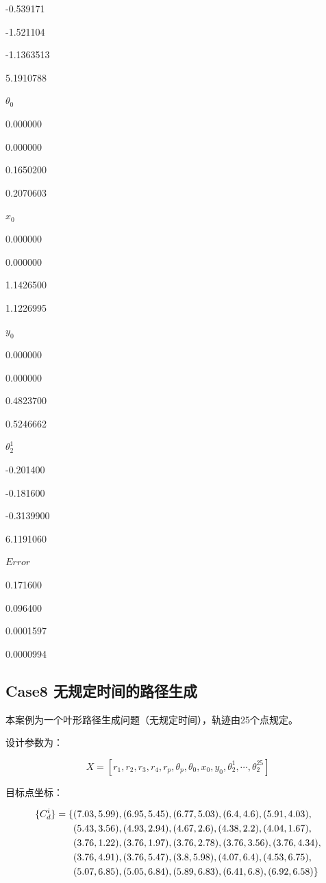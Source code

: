 \documentclass[]{ctexbook}
\theoremstyle{definition}
\theoremstyle{definition}
\theoremstyle{definition}
\theoremstyle{remark}
\begin{document}
-0.539171

-1.521104

-1.1363513

5.1910788

\(θ_0\)

0.000000

0.000000

0.1650200

0.2070603

\(x_0\)

0.000000

0.000000

1.1426500

1.1226995

\(y_0\)

0.000000

0.000000

0.4823700

0.5246662

\(θ_2^1\)

-0.201400

-0.181600

-0.3139900

6.1191060

\(Error\)

0.171600

0.096400

0.0001597

0.0000994

\subsection{Case8 无规定时间的路径生成}\label{case8-}

本案例为一个叶形路径生成问题（无规定时间），轨迹由25个点规定。

设计参数为：

\[
X = [r_1,r_2,r_3,r_4,r_p,\theta_p,\theta_0,x_0,y_0,\theta_2^1,\cdots,\theta_2^{25}]
\]

目标点坐标：

\begin{align}
\{C_d^i\} = \{&(7.03,5.99),(6.95,5.45),(6.77,5.03),(6.4,4.6),(5.91,4.03), \notag \\
&(5.43,3.56),(4.93,2.94),(4.67,2.6),(4.38,2.2),(4.04,1.67),\notag \\
&(3.76,1.22),(3.76,1.97),(3.76,2.78),(3.76,3.56),(3.76,4.34), \notag \\
&(3.76,4.91),(3.76,5.47),(3.8,5.98),(4.07,6.4),(4.53,6.75), \notag \\
&(5.07,6.85),(5.05,6.84),(5.89,6.83),(6.41,6.8),(6.92,6.58)\} \notag \\
\end{align}
\end{document}

